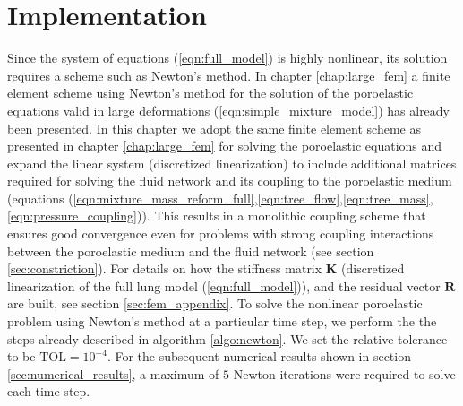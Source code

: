 \section{Implementation}
Since the system of equations (\ref{eqn:full_model}) is highly nonlinear, its solution requires a scheme such as Newton's method. In chapter \ref{chap:large_fem} a finite element scheme using Newton's method for the solution of the poroelastic equations valid in large deformations (\ref{eqn:simple_mixture_model}) has already been presented. In this chapter we adopt the same finite element scheme as presented in chapter \ref{chap:large_fem} for solving the poroelastic equations and expand the linear system (discretized linearization) to include additional matrices required for solving the fluid network and its coupling to the poroelastic medium (equations (\ref{eqn:mixture_mass_reform_full},\ref{eqn:tree_flow},\ref{eqn:tree_mass},\ref{eqn:pressure_coupling})). This results in a monolithic coupling scheme that ensures good convergence even for problems with strong coupling interactions between the poroelastic medium and the fluid network (see section \ref{sec:constriction}). For details on how the stiffness matrix $\boldsymbol{K}$ (discretized linearization of the full lung model (\ref{eqn:full_model})), and the residual vector $\boldsymbol{R}$ are built, see section \ref{sec:fem_appendix}. To solve the nonlinear poroelastic problem using Newton's method at a particular time step, we perform the the steps already described in algorithm \ref{algo:newton}. We set the relative tolerance to be $\mbox{TOL}=10^{-4}$. For the subsequent numerical results shown in section \ref{sec:numerical_results}, a maximum of $5$ Newton iterations were required to solve each time step.






